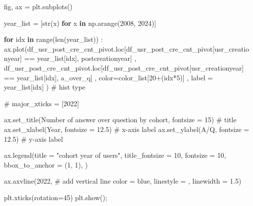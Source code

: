 \documentclass[
  letterpaper,
  DIV=11,
  numbers=noendperiod]{scrartcl}
\newenvironment{Shaded}{\begin{snugshade}}{\end{snugshade}}
\newcommand{\BuiltInTok}[1]{\textcolor[rgb]{0.00,0.23,0.31}{#1}}
\newcommand{\CommentTok}[1]{\textcolor[rgb]{0.37,0.37,0.37}{#1}}
\newcommand{\ControlFlowTok}[1]{\textcolor[rgb]{0.00,0.23,0.31}{\textbf{#1}}}
\newcommand{\DecValTok}[1]{\textcolor[rgb]{0.68,0.00,0.00}{#1}}
\newcommand{\FloatTok}[1]{\textcolor[rgb]{0.68,0.00,0.00}{#1}}
\newcommand{\KeywordTok}[1]{\textcolor[rgb]{0.00,0.23,0.31}{\textbf{#1}}}
\newcommand{\NormalTok}[1]{\textcolor[rgb]{0.00,0.23,0.31}{#1}}
\newcommand{\OperatorTok}[1]{\textcolor[rgb]{0.37,0.37,0.37}{#1}}
\newcommand{\StringTok}[1]{\textcolor[rgb]{0.13,0.47,0.30}{#1}}
\begin{document}
\begin{Shaded}
\begin{Highlighting}[]
\NormalTok{fig, ax }\OperatorTok{=}\NormalTok{ plt.subplots()}

\NormalTok{year\_list }\OperatorTok{=}\NormalTok{ [}\BuiltInTok{str}\NormalTok{(x) }\ControlFlowTok{for}\NormalTok{ x }\KeywordTok{in}\NormalTok{ np.arange(}\DecValTok{2008}\NormalTok{, }\DecValTok{2024}\NormalTok{)]}

\ControlFlowTok{for}\NormalTok{ idx }\KeywordTok{in} \BuiltInTok{range}\NormalTok{(}\BuiltInTok{len}\NormalTok{(year\_list)) :}
\NormalTok{  ax.plot(df\_usr\_post\_cre\_cnt\_pivot.loc[df\_usr\_post\_cre\_cnt\_pivot[}\StringTok{\textquotesingle{}usr\_creationyear\textquotesingle{}}\NormalTok{] }\OperatorTok{==}\NormalTok{ year\_list[idx], }\StringTok{\textquotesingle{}postcreationyear\textquotesingle{}}\NormalTok{]}
\NormalTok{      ,  df\_usr\_post\_cre\_cnt\_pivot.loc[df\_usr\_post\_cre\_cnt\_pivot[}\StringTok{\textquotesingle{}usr\_creationyear\textquotesingle{}}\NormalTok{] }\OperatorTok{==}\NormalTok{ year\_list[idx], }\StringTok{\textquotesingle{}a\_over\_q\textquotesingle{}}\NormalTok{]}
\NormalTok{      ,  color}\OperatorTok{=}\NormalTok{color\_list[}\DecValTok{20}\OperatorTok{+}\NormalTok{(idx}\OperatorTok{*}\DecValTok{5}\NormalTok{)]}
\NormalTok{      , label }\OperatorTok{=}\NormalTok{ year\_list[idx]}
\NormalTok{        ) }\CommentTok{\# hist type}


\CommentTok{\# major\_xticks = [\textquotesingle{}2022\textquotesingle{}]}

\NormalTok{ax.set\_title(}\StringTok{\textquotesingle{}Number of answer over question by cohort\textquotesingle{}}\NormalTok{, fontsize }\OperatorTok{=} \DecValTok{15}\NormalTok{) }\CommentTok{\# title}
\NormalTok{ax.set\_xlabel(}\StringTok{\textquotesingle{}Year\textquotesingle{}}\NormalTok{, fontsize }\OperatorTok{=} \FloatTok{12.5}\NormalTok{) }\CommentTok{\# x{-}axis label}
\NormalTok{ax.set\_ylabel(}\StringTok{\textquotesingle{}A/Q\textquotesingle{}}\NormalTok{, fontsize }\OperatorTok{=} \FloatTok{12.5}\NormalTok{) }\CommentTok{\# y{-}axis label}

\NormalTok{ax.legend(title }\OperatorTok{=} \StringTok{"cohort year of users"}\NormalTok{,}
\NormalTok{          title\_fontsize }\OperatorTok{=} \DecValTok{10}\NormalTok{, fontsize }\OperatorTok{=} \DecValTok{10}\NormalTok{,}
\NormalTok{          bbox\_to\_anchor }\OperatorTok{=}\NormalTok{ (}\DecValTok{1}\NormalTok{, }\DecValTok{1}\NormalTok{), }
\NormalTok{          )}

\NormalTok{ax.axvline(}\StringTok{\textquotesingle{}2022\textquotesingle{}}\NormalTok{, }\CommentTok{\# add vertical line}
\NormalTok{           color }\OperatorTok{=} \StringTok{\textquotesingle{}blue\textquotesingle{}}\NormalTok{,}
\NormalTok{           linestyle }\OperatorTok{=} \StringTok{\textquotesingle{}{-}{-}\textquotesingle{}}\NormalTok{,}
\NormalTok{           linewidth }\OperatorTok{=} \FloatTok{1.5}\NormalTok{)}


\NormalTok{plt.xticks(rotation}\OperatorTok{=}\DecValTok{45}\NormalTok{)}
\NormalTok{plt.show()}\OperatorTok{;}
\end{Highlighting}
\end{Shaded}
\end{document}
